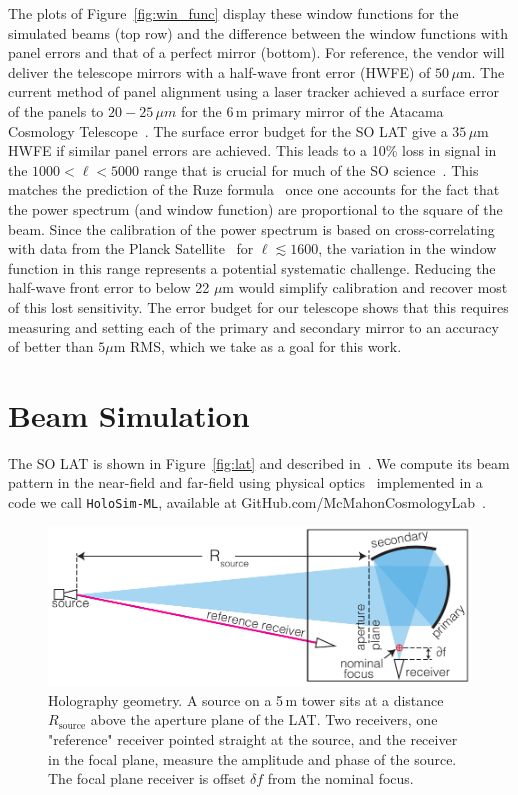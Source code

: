 The plots of Figure~\ref{fig:win_func} display these window functions for the simulated beams (top row) and the difference between the window functions with panel errors and that of a perfect mirror (bottom).  For reference, the vendor will deliver the telescope mirrors with a half-wave front error (HWFE) of $50\,\mu$m.  The current method of panel alignment using a laser tracker achieved a surface error of the panels to $20-25\,\mu  m$ for the 6\,m primary mirror of the Atacama Cosmology Telescope~\cite{act_inst}.  The surface error budget for the SO LAT give a $35\,\mu$m HWFE if similar panel errors are achieved.  This leads to a 10\% loss in signal in the $1000<\ell < 5000$ range that is crucial for much of the SO science~\cite{so_science}.  This matches the prediction of the Ruze formula~\cite{ruze} once one accounts for the fact that the power spectrum (and window function) are proportional to the square of the beam.  Since the calibration of the power spectrum is based on cross-correlating with data from the Planck Satellite~\cite{planck_data} for $\ell \lesssim 1600$, the variation in the window function in this range represents a potential systematic challenge.  Reducing the half-wave front error to below 22 $\mu$m would simplify calibration and recover most of this lost sensitivity.  The error budget for our telescope shows that this requires measuring and setting each of the primary and secondary mirror to an accuracy of better than $5 \mu$m RMS, which we take as a goal for this work.

\section{Beam Simulation}
\label{sec:simulate}
The SO LAT is shown in Figure~\ref{fig:lat} and described in~\cite{2021RNAAS...5..100X}.  We compute its beam pattern in the near-field and far-field using physical optics~\cite{hecht,Gudmundsson:21} implemented in a code we call \verb|HoloSim-ML|, available at GitHub.com/McMahonCosmologyLab~\cite{McMahonCosmologyLab}.

\begin{figure}
    \centering
    \includegraphics[width = .9\textwidth]{Figures/holography_geo3.pdf}
    \caption{Holography geometry. A source on a 5\,m tower sits at a distance $ R_{\text{source}}$ above the aperture plane of the LAT. Two receivers, one "reference" receiver pointed straight at the source, and the receiver in the focal plane, measure the amplitude and phase of the source. The focal plane receiver is offset $\delta f$ from the nominal focus.}
    \label{fig:hologeo}
\end{figure}

